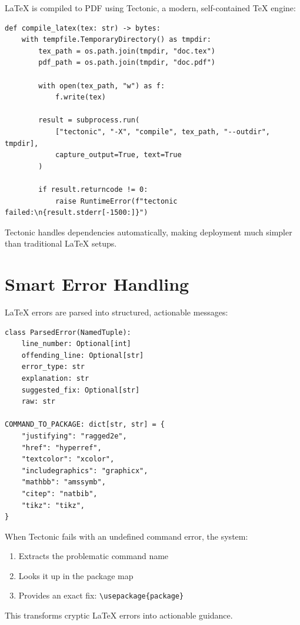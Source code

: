 \documentclass[12pt, a4paper]{article}
\begin{document}
LaTeX is compiled to PDF using Tectonic, a modern, self-contained TeX engine:

\begin{verbatim}
def compile_latex(tex: str) -> bytes:
    with tempfile.TemporaryDirectory() as tmpdir:
        tex_path = os.path.join(tmpdir, "doc.tex")
        pdf_path = os.path.join(tmpdir, "doc.pdf")

        with open(tex_path, "w") as f:
            f.write(tex)

        result = subprocess.run(
            ["tectonic", "-X", "compile", tex_path, "--outdir", tmpdir],
            capture_output=True, text=True
        )

        if result.returncode != 0:
            raise RuntimeError(f"tectonic failed:\n{result.stderr[-1500:]}")
\end{verbatim}

Tectonic handles dependencies automatically, making deployment much simpler than traditional LaTeX setups.

\newpage

\section{Smart Error Handling}

LaTeX errors are parsed into structured, actionable messages:

\begin{verbatim}
class ParsedError(NamedTuple):
    line_number: Optional[int]
    offending_line: Optional[str]
    error_type: str
    explanation: str
    suggested_fix: Optional[str]
    raw: str

COMMAND_TO_PACKAGE: dict[str, str] = {
    "justifying": "ragged2e",
    "href": "hyperref",
    "textcolor": "xcolor",
    "includegraphics": "graphicx",
    "mathbb": "amssymb",
    "citep": "natbib",
    "tikz": "tikz",
}
\end{verbatim}

When Tectonic fails with an undefined command error, the system:
\begin{enumerate}
    \item Extracts the problematic command name
    \item Looks it up in the package map
    \item Provides an exact fix: \texttt{\textbackslash usepackage\{package\}}
\end{enumerate}

This transforms cryptic LaTeX errors into actionable guidance.
\end{document}
